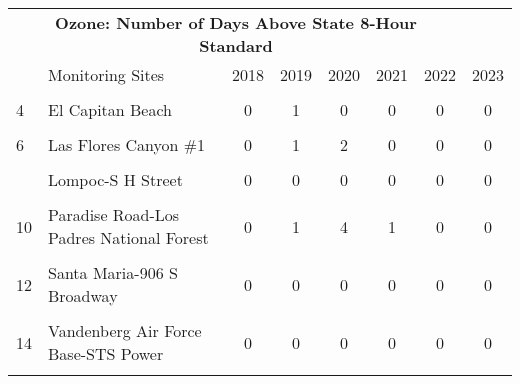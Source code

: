 \begin{table}
\centering
\begin{tabular}{llcccccc}
\toprule
\multicolumn{7}{c}{\textbf{Ozone: Number of Days Above State 8-Hour Standard}} \\
\cmidrule(l{3pt}r{3pt}){1-7}
  & Monitoring Sites & 2018 & 2019 & 2020 & 2021 & 2022 & 2023\\
\midrule
\textbf{\cellcolor{gray!10}{3}} & \textbf{\cellcolor{gray!10}{Carpinteria-Gobernador Road}} & \textbf{\cellcolor{gray!10}{0}} & \textbf{\cellcolor{gray!10}{0}} & \textbf{\cellcolor{gray!10}{2}} & \textbf{\cellcolor{gray!10}{0}} & \textbf{\cellcolor{gray!10}{0}} & \textbf{\cellcolor{gray!10}{0}}\\
4 & El Capitan Beach & 0 & 1 & 0 & 0 & 0 & 0\\
\cellcolor{gray!10}{5} & \cellcolor{gray!10}{Goleta-Fairview} & \cellcolor{gray!10}{0} & \cellcolor{gray!10}{0} & \cellcolor{gray!10}{0} & \cellcolor{gray!10}{0} & \cellcolor{gray!10}{0} & \cellcolor{gray!10}{0}\\
6 & Las Flores Canyon \#1 & 0 & 1 & 2 & 0 & 0 & 0\\
\cellcolor{gray!10}{7} & \cellcolor{gray!10}{Lompoc-HSandP} & \cellcolor{gray!10}{0} & \cellcolor{gray!10}{0} & \cellcolor{gray!10}{0} & \cellcolor{gray!10}{0} & \cellcolor{gray!10}{0} & \cellcolor{gray!10}{0}\\
\addlinespace
8 & Lompoc-S H Street & 0 & 0 & 0 & 0 & 0 & 0\\
\cellcolor{gray!10}{9} & \cellcolor{gray!10}{Nojoqui Pass} & \cellcolor{gray!10}{0} & \cellcolor{gray!10}{0} & \cellcolor{gray!10}{0} & \cellcolor{gray!10}{0} & \cellcolor{gray!10}{0} & \cellcolor{gray!10}{0}\\
10 & Paradise Road-Los Padres National Forest & 0 & 1 & 4 & 1 & 0 & 0\\
\cellcolor{gray!10}{11} & \cellcolor{gray!10}{Santa Barbara-700 East Canon Perdido} & \cellcolor{gray!10}{0} & \cellcolor{gray!10}{0} & \cellcolor{gray!10}{2} & \cellcolor{gray!10}{0} & \cellcolor{gray!10}{0} & \cellcolor{gray!10}{0}\\
12 & Santa Maria-906 S Broadway & 0 & 0 & 0 & 0 & 0 & 0\\
\addlinespace
\cellcolor{gray!10}{13} & \cellcolor{gray!10}{Santa Ynez-Airport Road} & \cellcolor{gray!10}{0} & \cellcolor{gray!10}{0} & \cellcolor{gray!10}{0} & \cellcolor{gray!10}{0} & \cellcolor{gray!10}{0} & \cellcolor{gray!10}{0}\\
14 & Vandenberg Air Force Base-STS Power & 0 & 0 & 0 & 0 & 0 & 0\\
\cellcolor{gray!10}{15} & \cellcolor{gray!10}{Countywide} & \cellcolor{gray!10}{0} & \cellcolor{gray!10}{1} & \cellcolor{gray!10}{6} & \cellcolor{gray!10}{1} & \cellcolor{gray!10}{0} & \cellcolor{gray!10}{0}\\
\bottomrule
\end{tabular}
\end{table}
